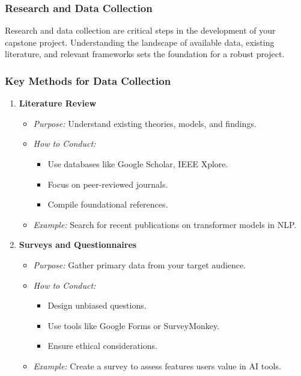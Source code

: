 \documentclass[aspectratio=169]{beamer}
\begin{document}
\begin{frame}
    \frametitle{Research and Data Collection}
    Research and data collection are critical steps in the development of your capstone project. 
    Understanding the landscape of available data, existing literature, and relevant frameworks sets the foundation for a robust project.
\end{frame}

\begin{frame}
    \frametitle{Key Methods for Data Collection}
    \begin{enumerate}
        \item \textbf{Literature Review}
        \begin{itemize}
            \item \textit{Purpose:} Understand existing theories, models, and findings.
            \item \textit{How to Conduct:}
            \begin{itemize}
                \item Use databases like Google Scholar, IEEE Xplore.
                \item Focus on peer-reviewed journals.
                \item Compile foundational references.
            \end{itemize}
            \item \textit{Example:} Search for recent publications on transformer models in NLP.
        \end{itemize}
        
        \item \textbf{Surveys and Questionnaires}
        \begin{itemize}
            \item \textit{Purpose:} Gather primary data from your target audience.
            \item \textit{How to Conduct:}
            \begin{itemize}
                \item Design unbiased questions.
                \item Use tools like Google Forms or SurveyMonkey.
                \item Ensure ethical considerations.
            \end{itemize}
            \item \textit{Example:} Create a survey to assess features users value in AI tools.
        \end{itemize}
    \end{enumerate}
\end{frame}
\end{document}
